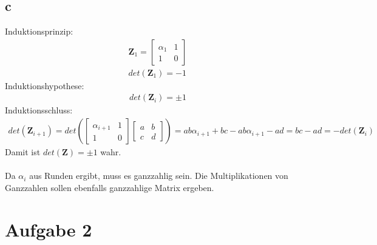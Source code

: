 \documentclass[12pt
,headinclude
,headsepline
,bibtotocnumbered
]{scrartcl}
\begin{document}
\subsection{c}
Induktionsprinzip:
\begin{align*}
	\boldsymbol{Z}_1=\begin{bmatrix}
		\alpha_1&1\\1&0
	\end{bmatrix}\\
det(\boldsymbol{Z}_1)=-1
\end{align*}
Induktionshypothese:
\begin{align*}
	det(\boldsymbol{Z}_i)=\pm1
\end{align*}
Induktionsschluss:
\begin{align*}
	det(\boldsymbol{Z}_{i+1})=det(\begin{bmatrix}
		\alpha_{i+1}&1\\1&0
	\end{bmatrix}\begin{bmatrix}
	a&b\\c&d
\end{bmatrix})=ab\alpha_{i+1}+bc-ab\alpha_{i+1}-ad=bc-ad=-det(\boldsymbol{Z}_i)
\end{align*}
Damit ist $det(\boldsymbol{Z})=\pm1$ wahr.\\\\
Da $\alpha_i$ aus Runden ergibt, muss es ganzzahlig sein. Die Multiplikationen von Ganzzahlen sollen ebenfalls ganzzahlige Matrix ergeben.
\section{Aufgabe 2}
\end{document}
